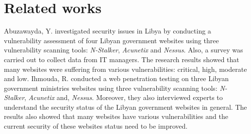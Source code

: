 \documentclass[conference,letterpaper]{IEEEtran}
\begin{document}
%



\section{Related works}

Abuzawayda, Y.\cite{IJIR3439} investigated security issues in Libya by
conducting a vulnerability assessment of four Libyan government
websites using three vulnerability scanning tools: \emph{N-Stalker},
\emph{Acunetix} and \emph{Nessus}. Also, a survey was carried out to
collect data from IT managers. The research results showed that many
websites were suffering from various vulnerabilities: critical, high,
moderate and low. Ihmouda, R.\cite{ihmouda2013penetration} conducted a web penetration testing on three Libyan government ministries websites using three vulnerability scanning
tools: \emph{N-Stalker}, \emph{Acunetix} and, \emph{Nessus}.  Moreover, they
also interviewed experts to understand the security status of the Libyan
government websites in general. The results also showed that many websites have
various vulnerabilities and the current security of these websites status need
to be improved.
\end{document}
